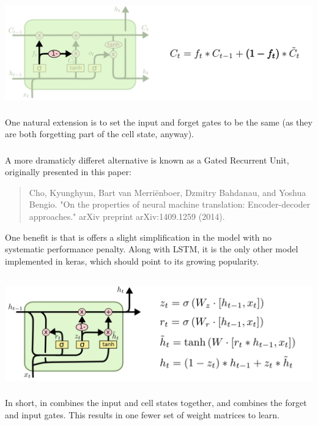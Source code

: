 \documentclass[xetex,mathserif,serif,aspectratio=169]{beamer}
\begin{document}
\begin{frame}[fragile] \frametitle{} \oldB \small

\begin{center}
\includegraphics[height=4.5cm]{img/cloah14.png}
\end{center}

One natural extension is to set the input and forget
gates to be the same (as they are both forgetting
part of the cell state, anyway).

\end{frame}

\begin{frame}[fragile] \frametitle{} \oldB \small

A more dramaticly differet alternative is known as
a Gated Recurrent Unit, originally presented in this
paper:
\begin{quote}
Cho, Kyunghyun, Bart van Merriënboer, Dzmitry Bahdanau,
and Yoshua Bengio. "On the properties of neural machine
translation: Encoder-decoder approaches."
arXiv preprint arXiv:1409.1259 (2014).
\end{quote}
One benefit is that is offers a slight simplification in
the model with no systematic performance penalty. Along
with LSTM, it is the only other model implemented in
keras, which should point to its growing popularity.

\end{frame}

\begin{frame}[fragile] \frametitle{} \oldB \small

\begin{center}
\includegraphics[height=4.5cm]{img/cloah15.png}
\end{center}

In short, in combines the input and cell states together,
and combines the forget and input gates. This results in
one fewer set of weight matrices to learn.

\end{frame}
\end{document}
